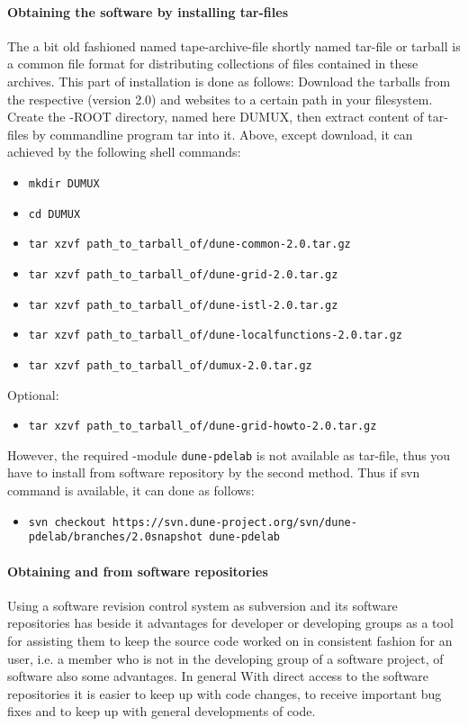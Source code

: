\paragraph{Obtaining the software by installing tar-files}
The a bit old fashioned named tape-archive-file shortly named tar-file or tarball is a common file format for distributing collections of files contained in these archives.
This part of installation is done as follows: 
Download the tarballs from the respective \Dune (version 2.0) and \Dumux websites to a certain path in your filesystem.
Create the {\Dune}-ROOT directory, named here DUMUX, then extract content of tar-files by commandline program tar into it.
Above, except download, it can achieved by the following shell commands:
\begin{itemize}
\item \texttt{mkdir DUMUX}
\item \texttt{cd DUMUX}
\item \texttt{tar xzvf path\_to\_tarball\_of/dune-common-2.0.tar.gz }
\item \texttt{tar xzvf path\_to\_tarball\_of/dune-grid-2.0.tar.gz }
\item \texttt{tar xzvf path\_to\_tarball\_of/dune-istl-2.0.tar.gz }
\item \texttt{tar xzvf path\_to\_tarball\_of/dune-localfunctions-2.0.tar.gz }
\item \texttt{tar xzvf path\_to\_tarball\_of/dumux-2.0.tar.gz}
\end{itemize} 
Optional:
\begin{itemize}
\item \texttt{tar xzvf path\_to\_tarball\_of/dune-grid-howto-2.0.tar.gz}
\end{itemize} 
However, the required \Dune-module \texttt{dune-pdelab} is not available as tar-file, thus you have to install from software repository by the second method.  Thus if svn command is available, it can done as follows: 
\begin{itemize}
\item \texttt{svn checkout https://svn.dune-project.org/svn/dune-pdelab/branches/2.0snapshot dune-pdelab}
\end{itemize} 

\paragraph{Obtaining \Dune and \Dumux from software repositories} 

Using a software revision control system as subversion and its software repositories has beside it advantages for developer or developing groups as a tool for assisting them to keep the source code worked on in consistent fashion for an user, i.e. a member who is not in the developing group of a software project, of software also some advantages.
In general With direct access to the software repositories it is easier to keep up with code changes, to receive important bug fixes and to keep up with general developments of code.

